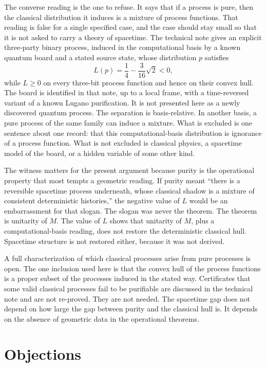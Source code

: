 \documentclass[11pt]{article}
\begin{document}
The converse reading is the one to refuse. It says that if a process is pure, then the classical distribution it induces is a mixture of process functions. That reading is false for a single specified case, and the case should stay small so that it is not asked to carry a theory of spacetime. The technical note gives an explicit three-party binary process, induced in the computational basis by a known quantum board and a stated source state, whose distribution \(p\) satisfies
\[
L(p)=\frac14-\frac{3}{16}\sqrt{2}<0,
\]
while \(L\geq 0\) on every three-bit process function and hence on their convex hull. The board is identified in that note, up to a local frame, with a time-reversed variant of a known Lugano purification. It is not presented here as a newly discovered quantum process. The separation is basis-relative. In another basis, a pure process of the same family can induce a mixture. What is excluded is one sentence about one record: that this computational-basis distribution is ignorance of a process function. What is not excluded is classical physics, a spacetime model of the board, or a hidden variable of some other kind.

The witness matters for the present argument because purity is the operational property that most tempts a geometric reading. If purity meant ``there is a reversible spacetime process underneath, whose classical shadow is a mixture of consistent deterministic histories,'' the negative value of \(L\) would be an embarrassment for that slogan. The slogan was never the theorem. The theorem is unitarity of \(M\). The value of \(L\) shows that unitarity of \(M\), plus a computational-basis reading, does not restore the deterministic classical hull. Spacetime structure is not restored either, because it was not derived.

A full characterization of which classical processes arise from pure processes is open. The one inclusion used here is that the convex hull of the process functions is a proper subset of the processes induced in the stated way. Certificates that some valid classical processes fail to be purifiable are discussed in the technical note and are not re-proved. They are not needed. The spacetime gap does not depend on how large the gap between purity and the classical hull is. It depends on the absence of geometric data in the operational theorems.

\section{Objections}
\label{sec:obj}
\end{document}

